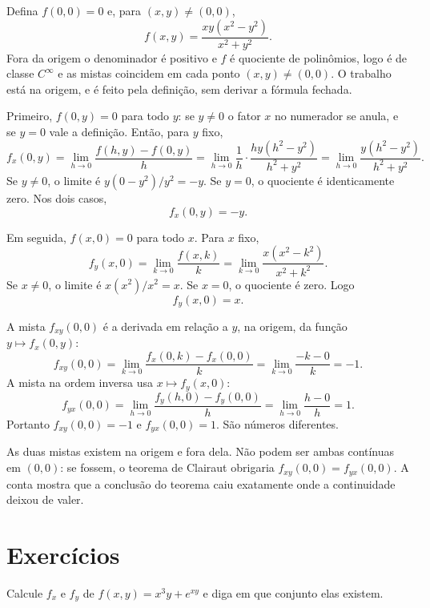 \documentclass[11pt,a4paper]{article}
\begin{document}
\begin{contraexemplo}
Defina $f(0,0)=0$ e, para $(x,y)\neq(0,0)$,
\[
f(x,y)=\frac{xy(x^2-y^2)}{x^2+y^2}.
\]
Fora da origem o denominador é positivo e $f$ é quociente de polinômios, logo é de classe $C^\infty$ e as mistas coincidem em cada ponto $(x,y)\neq(0,0)$. O trabalho está na origem, e é feito pela definição, sem derivar a fórmula fechada.

Primeiro, $f(0,y)=0$ para todo $y$: se $y\neq 0$ o fator $x$ no numerador se anula, e se $y=0$ vale a definição. Então, para $y$ fixo,
\[
f_x(0,y)=\lim_{h\to 0}\frac{f(h,y)-f(0,y)}{h}=\lim_{h\to 0}\frac{1}{h}\cdot\frac{h y(h^2-y^2)}{h^2+y^2}=\lim_{h\to 0}\frac{y(h^2-y^2)}{h^2+y^2}.
\]
Se $y\neq 0$, o limite é $y(0-y^2)/y^2=-y$. Se $y=0$, o quociente é identicamente zero. Nos dois casos,
\begin{equation}
f_x(0,y)=-y.\label{eq:fx-eixo}
\end{equation}

Em seguida, $f(x,0)=0$ para todo $x$. Para $x$ fixo,
\[
f_y(x,0)=\lim_{k\to 0}\frac{f(x,k)}{k}=\lim_{k\to 0}\frac{x(x^2-k^2)}{x^2+k^2}.
\]
Se $x\neq 0$, o limite é $x(x^2)/x^2=x$. Se $x=0$, o quociente é zero. Logo
\begin{equation}
f_y(x,0)=x.\label{eq:fy-eixo}
\end{equation}

A mista $f_{xy}(0,0)$ é a derivada em relação a $y$, na origem, da função $y\mapsto f_x(0,y)$:
\[
f_{xy}(0,0)=\lim_{k\to 0}\frac{f_x(0,k)-f_x(0,0)}{k}=\lim_{k\to 0}\frac{-k-0}{k}=-1.
\]
A mista na ordem inversa usa $x\mapsto f_y(x,0)$:
\[
f_{yx}(0,0)=\lim_{h\to 0}\frac{f_y(h,0)-f_y(0,0)}{h}=\lim_{h\to 0}\frac{h-0}{h}=1.
\]
Portanto $f_{xy}(0,0)=-1$ e $f_{yx}(0,0)=1$. São números diferentes.

As duas mistas existem na origem e fora dela. Não podem ser ambas contínuas em $(0,0)$: se fossem, o teorema de Clairaut obrigaria $f_{xy}(0,0)=f_{yx}(0,0)$. A conta mostra que a conclusão do teorema caiu exatamente onde a continuidade deixou de valer.
\end{contraexemplo}

\section{Exercícios}

\begin{exercicio}
Calcule $f_x$ e $f_y$ de $f(x,y)=x^3 y+e^{xy}$ e diga em que conjunto elas existem.
\end{exercicio}
\end{document}
